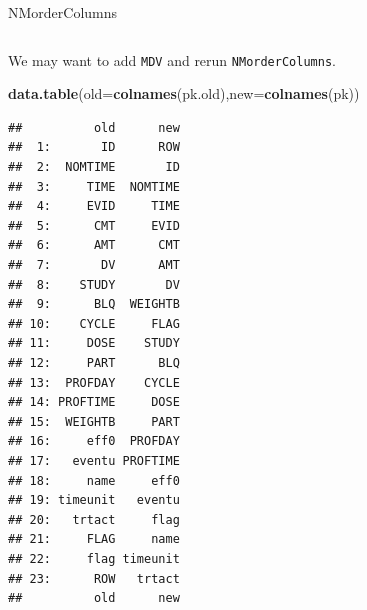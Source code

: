 \documentclass[
  8pt,
  ignorenonframetext,
  aspectratio=169]{beamer}
\newenvironment{Shaded}{\begin{snugshade}}{\end{snugshade}}
\newcommand{\DataTypeTok}[1]{\textcolor[rgb]{0.13,0.29,0.53}{#1}}
\newcommand{\KeywordTok}[1]{\textcolor[rgb]{0.13,0.29,0.53}{\textbf{#1}}}
\newcommand{\NormalTok}[1]{#1}
\begin{document}
\begin{frame}[fragile]{NMorderColumns}
\begin{columns}[T]
\begin{column}{0.48\textwidth}
We may want to add \texttt{MDV} and rerun \texttt{NMorderColumns}.
\footnotesize

\begin{Shaded}
\begin{Highlighting}[]
\KeywordTok{data.table}\NormalTok{(}\DataTypeTok{old=}\KeywordTok{colnames}\NormalTok{(pk.old),}\DataTypeTok{new=}\KeywordTok{colnames}\NormalTok{(pk))}
\end{Highlighting}
\end{Shaded}

\begin{verbatim}
##          old      new
##  1:       ID      ROW
##  2:  NOMTIME       ID
##  3:     TIME  NOMTIME
##  4:     EVID     TIME
##  5:      CMT     EVID
##  6:      AMT      CMT
##  7:       DV      AMT
##  8:    STUDY       DV
##  9:      BLQ  WEIGHTB
## 10:    CYCLE     FLAG
## 11:     DOSE    STUDY
## 12:     PART      BLQ
## 13:  PROFDAY    CYCLE
## 14: PROFTIME     DOSE
## 15:  WEIGHTB     PART
## 16:     eff0  PROFDAY
## 17:   eventu PROFTIME
## 18:     name     eff0
## 19: timeunit   eventu
## 20:   trtact     flag
## 21:     FLAG     name
## 22:     flag timeunit
## 23:      ROW   trtact
##          old      new
\end{verbatim}
\end{column}

\normalsize
\end{columns}
\end{frame}
\end{document}
